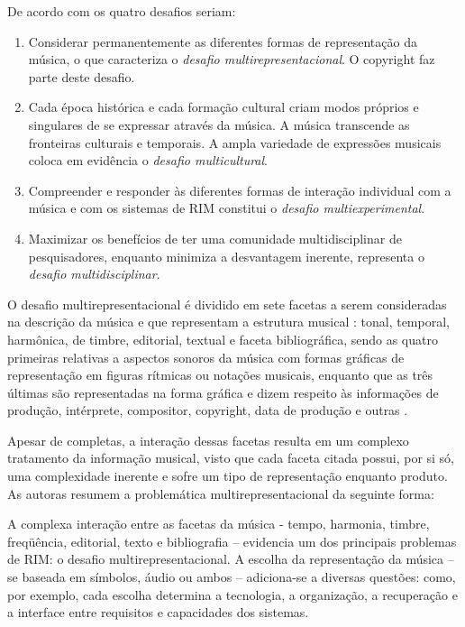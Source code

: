 De acordo com  os quatro desafios seriam:

\begin{citacao}
    \begin{enumerate}
        \item Considerar permanentemente as diferentes formas de representação da música, o que caracteriza o \textit{desafio multirepresentacional}. O copyright faz parte deste desafio.
        \item Cada época histórica e cada formação cultural criam modos próprios e singulares de se expressar através da música. A música transcende as fronteiras culturais e temporais. A ampla variedade de expressões musicais coloca em evidência o \textit{desafio multicultural}.
        \item Compreender e responder às diferentes formas de interação individual com a música e com os sistemas de RIM constitui o \textit{desafio multiexperimental}.
        \item Maximizar os benefícios de ter uma comunidade multidisciplinar de pesquisadores, enquanto minimiza a desvantagem inerente, representa o \textit{desafio multidisciplinar}.
    \end{enumerate}
\end{citacao}

O desafio multirepresentacional é dividido em sete facetas a serem consideradas na descrição da música e que representam a estrutura musical \cite{downie2003}: tonal, temporal, harmônica, de timbre, editorial, textual e faceta bibliográfica, sendo as quatro primeiras relativas a aspectos sonoros da música com formas gráficas de representação em figuras rítmicas ou notações musicais, enquanto que as três últimas são representadas na forma gráfica e dizem respeito às informações de produção, intérprete, compositor, copyright, data de produção e outras \cite{barros2012}.

Apesar de completas, a interação dessas facetas resulta em um complexo tratamento da informação musical, visto que cada faceta citada possui, por si só, uma complexidade inerente e sofre um tipo de representação enquanto produto. As autoras  resumem a problemática multirepresentacional da seguinte forma:

\begin{citacao}
    A complexa interação entre as facetas da música - tempo, harmonia, timbre, freqüência, editorial, texto e bibliografia – evidencia um dos principais problemas de RIM: o desafio multirepresentacional. A escolha da representação da música – se baseada em símbolos, áudio ou ambos – adiciona-se a diversas questões: como, por exemplo, cada escolha determina a tecnologia, a organização, a recuperação e a interface entre requisitos e capacidades dos sistemas.
\end{citacao}


